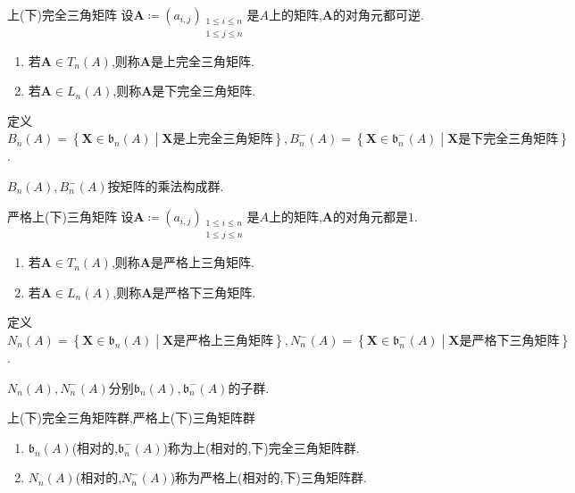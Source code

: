\begin{definition}{上(下)完全三角矩阵}{}
	设$\boldsymbol{A}\coloneq\left(a_{i,j}\right)_{\substack{1\leq i\leq n\\1\leq j\leq n}}$是$A$上的矩阵,$\boldsymbol{A}$的对角元都可逆.
	\begin{enumerate}
		\item 若$\boldsymbol{A}\in T_{n}\left(A\right)$,则称$\boldsymbol{A}$是上完全三角矩阵.
		\item 若$\boldsymbol{A}\in L_{n}\left(A\right)$,则称$\boldsymbol{A}$是下完全三角矩阵.
	\end{enumerate}
	定义$B_{n}\left(A\right)=\left\{\boldsymbol{X}\in \mathfrak{b}_{n}\left(A\right)\middle|\boldsymbol{X}\text{是上完全三角矩阵}\right\},B_{n}^{-}\left(A\right)=\left\{\boldsymbol{X}\in \mathfrak{b}_{n}^{-}\left(A\right)\middle|\boldsymbol{X}\text{是下完全三角矩阵}\right\}$.
\end{definition}

\begin{proposition}{}{}
	$B_{n}\left(A\right),B_{n}^{-}\left(A\right)$按矩阵的乘法构成群.
\end{proposition}

\begin{definition}{严格上(下)三角矩阵}{}
	设$\boldsymbol{A}\coloneq\left(a_{i,j}\right)_{\substack{1\leq i\leq n\\1\leq j\leq n}}$是$A$上的矩阵,$\boldsymbol{A}$的对角元都是$1$.
	\begin{enumerate}
		\item 若$\boldsymbol{A}\in T_{n}\left(A\right)$,则称$\boldsymbol{A}$是严格上三角矩阵.
		\item 若$\boldsymbol{A}\in L_{n}\left(A\right)$,则称$\boldsymbol{A}$是严格下三角矩阵.
	\end{enumerate}
	定义$N_{n}\left(A\right)=\left\{\boldsymbol{X}\in \mathfrak{b}_{n}\left(A\right)\middle|\boldsymbol{X}\text{是严格上三角矩阵}\right\},N_{n}^{-}\left(A\right)=\left\{\boldsymbol{X}\in \mathfrak{b}_{n}^{-}\left(A\right)\middle|\boldsymbol{X}\text{是严格下三角矩阵}\right\}$.
\end{definition}

\begin{proposition}{}{}
	$N_{n}\left(A\right),N_{n}^{-}\left(A\right)$分别$\mathfrak{b}_{n}\left(A\right),\mathfrak{b}_{n}^{-}\left(A\right)$的子群.
\end{proposition}

\begin{definition}{上(下)完全三角矩阵群,严格上(下)三角矩阵群}{}
	\begin{enumerate}
		\item $\mathfrak{b}_{n}\left(A\right)$(相对的,$\mathfrak{b}_{n}^{-}\left(A\right)$)称为上(相对的,下)完全三角矩阵群.
		\item $N_{n}\left(A\right)$(相对的,$N_{n}^{-}\left(A\right)$)称为严格上(相对的,下)三角矩阵群.
	\end{enumerate}
\end{definition}

